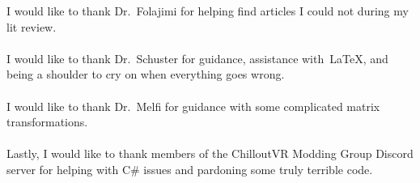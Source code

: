 \documentclass{wit-thesis}
\begin{document}
\listoftables


\listoffigures


\begin{acknowledgments}
  I would like to thank Dr.~Folajimi for helping find articles I could not during my lit review.\\\\
  I would like to thank Dr.~Schuster for guidance, assistance with~\LaTeX, and being a shoulder to cry on when everything goes wrong.\\\\
  I would like to thank Dr.~Melfi for guidance with some complicated matrix transformations.\\\\
  Lastly, I would like to thank members of the ChilloutVR Modding Group Discord server for helping with C\# issues and pardoning some truly terrible code.

\end{acknowledgments}



% 
% 


% 
%
%



%
\end{document}
